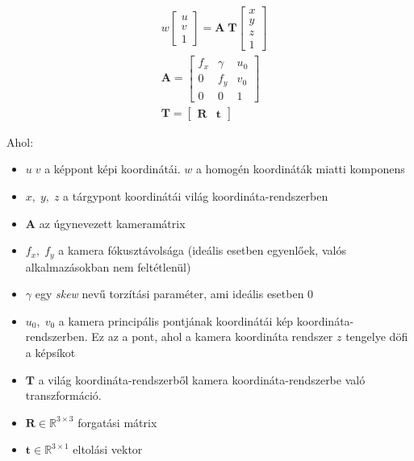\begin{align}
\label{eq:cam-trf-basic}
&w \left[ \begin{array}{c} u \\ v \\ 1 \end{array} \right] = \mathbf{A} \; \mathbf{T} \left[ \begin{array}{c} x \\ y \\ z \\ 1 \end{array} \right] \\ \nonumber
&\mathbf{A} = 
\left[ 
\begin{array}{ccc}
f_x & \gamma & u_0 \\
0 & f_y & v_0 \\
0 & 0 & 1
\end{array}
\right] \\ \nonumber
&\mathbf{T} = \left[
\begin{array}{cc}
\mathbf{R} & \mathbf{t}
\end{array}
\right]
\end{align}

Ahol:
\begin{itemize}
\item $u\; v$ a képpont képi koordinátái. $w$ a homogén koordináták miatti komponens
\item $x,\; y,\; z$ a tárgypont koordinátái világ koordináta-rendszerben
\item $\mathbf{A}$ az úgynevezett kameramátrix
\item $f_x, \; f_y$ a kamera fókusztávolsága (ideális esetben egyenlőek, valós alkalmazásokban nem feltétlenül)
\item $\gamma$ egy \textit{skew} nevű torzítási paraméter, ami ideális esetben 0
\item $u_0,\; v_0$ a kamera principális pontjának koordinátái kép koordináta-rendszerben. Ez az a pont, ahol a kamera koordináta rendszer $z$ tengelye döfi a képsíkot
\item $\mathbf{T}$ a világ koordináta-rendszerből kamera koordináta-rendszerbe való transzformáció.
\item $\mathbf{R} \in \mathbb{R}^{3 \times 3}$ forgatási mátrix
\item $\mathbf{t} \in \mathbb{R}^{3 \times 1}$ eltolási vektor
\end{itemize}
 
